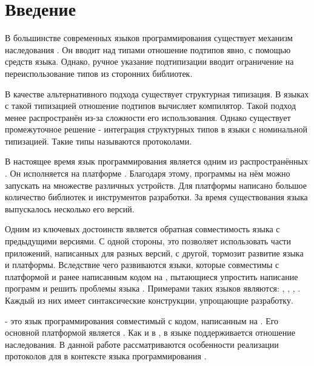 \section*{Введение}

В большинстве современных языков программирования существует механизм наследования \cite{Cook:1989:IS:96709.96721}. Он вводит над типами отношение подтипов явно, с помощью средств языка. Однако, ручное указание подтипизации вводит ограничение на переиспользование типов из сторонних библиотек.

В качестве альтернативного подхода существует структурная типизация\cite{book:pierce}. В языках с такой типизацией отношение подтипов вычисляет компилятор. Такой подход менее распространён из-за сложности его использования. Однако существует промежуточное решение - интеграция структурных типов в языки с номинальной типизацией. Такие типы называются протоколами.

В настоящее время язык программирования  является одним из распространённых \cite{tiobe}. Он исполняется на платформе   . Благодаря этому, программы на нём можно запускать на множестве различных устройств. Для платформы написано большое количество библиотек и инструментов разработки. За время существования языка выпускалось несколько его версий.

Одним из ключевых достоинств  является обратная совместимость языка с предыдущими версиями\cite{openjdk:compatibility}. С одной стороны, это позволяет использовать части приложений, написанных для разных версий, с другой, тормозит развитие языка и платформы. Вследствие чего развиваются языки, которые совместимы с платформой  и ранее написанным кодом на , пытающиеся упростить написание программ и решить проблемы языка . Примерами таких языков являются: , , , . Каждый из них имеет синтаксические конструкции, упрощающие разработку.

 - это язык программирования совместимый с кодом, написанным на . Его основной платформой является . Как и в , в языке  поддерживается отношение наследования. В данной работе рассматриваются особенности реализации протоколов для  в контексте языка программирования .
